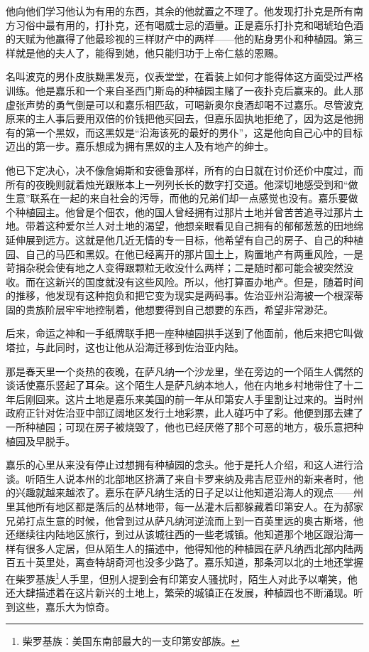 \par 他向他们学习他认为有用的东西，其余的他就置之不理了。他发现打扑克是所有南方习俗中最有用的，打扑克，还有喝威士忌的酒量。正是嘉乐打扑克和喝琥珀色酒的天赋为他赢得了他最珍视的三样财产中的两样——他的贴身男仆和种植园。第三样就是他的夫人了，能得到她，他只能归功于上帝仁慈的恩赐。
\par 名叫波克的男仆皮肤黝黑发亮，仪表堂堂，在着装上如何才能得体这方面受过严格训练。他是嘉乐和一个来自圣西门斯岛的种植园主赌了一夜扑克后赢来的。此人那虚张声势的勇气倒是可以和嘉乐相匹敌，可喝新奥尔良酒却喝不过嘉乐。尽管波克原来的主人事后要用双倍的价钱把他买回去，但嘉乐固执地拒绝了，因为这是他拥有的第一个黑奴，而这黑奴是“沿海该死的最好的男仆”，这是他向自己心中的目标迈出的第一步。嘉乐想成为拥有黑奴的主人及有地产的绅士。
\par 他已下定决心，决不像詹姆斯和安德鲁那样，所有的白日就在讨价还价中度过，而所有的夜晚则就着烛光跟账本上一列列长长的数字打交道。他深切地感受到和“做生意”联系在一起的来自社会的污辱，而他的兄弟们却一点感觉也没有。嘉乐要做个种植园主。他曾是个佃农，他的国人曾经拥有过那片土地并曾苦苦追寻过那片土地。带着这种爱尔兰人对土地的渴望，他想亲眼看见自己拥有的郁郁葱葱的田地绵延伸展到远方。这就是他几近无情的专一目标，他希望有自己的房子、自己的种植园、自己的马匹和黑奴。在他已经离开的那片国土上，购置地产有两重风险，一是苛捐杂税会使有地之人变得跟颗粒无收没什么两样；二是随时都可能会被突然没收。而在这新兴的国度就没有这些风险。所以，他打算置办地产。但是，随着时间的推移，他发现有这种抱负和把它变为现实是两码事。佐治亚州沿海被一个根深蒂固的贵族阶层牢牢地控制着，他想要得到自己想要的东西，希望非常渺茫。
\par 后来，命运之神和一手纸牌联手把一座种植园拱手送到了他面前，他后来把它叫做塔拉，与此同时，这也让他从沿海迁移到佐治亚内陆。
\par 那是春天里一个炎热的夜晚，在萨凡纳一个沙龙里，坐在旁边的一个陌生人偶然的谈话使嘉乐竖起了耳朵。这个陌生人是萨凡纳本地人，他在内地乡村地带住了十二年后刚回来。这片土地是嘉乐来美国的前一年从印第安人手里割让过来的。当时州政府正针对佐治亚中部辽阔地区发行土地彩票，此人碰巧中了彩。他便到那去建了一所种植园；可现在房子被烧毁了，他也已经厌倦了那个可恶的地方，极乐意把种植园及早脱手。
\par 嘉乐的心里从来没有停止过想拥有种植园的念头。他于是托人介绍，和这人进行洽谈。听陌生人说本州的北部地区挤满了来自卡罗来纳及弗吉尼亚州的新来者时，他的兴趣就越来越浓了。嘉乐在萨凡纳生活的日子足以让他知道沿海人的观点——州里其他所有地区都是落后的丛林地带，每一丛灌木后都躲藏着印第安人。在为郝家兄弟打点生意的时候，他曾到过从萨凡纳河逆流而上到一百英里远的奥古斯塔，他还继续往内陆地区旅行，到过从该城往西的一些老城镇。他知道那个地区跟沿海一样有很多人定居，但从陌生人的描述中，他得知他的种植园在萨凡纳西北部内陆两百五十英里处，离查特胡奇河也没多少路了。嘉乐知道，那条河以北的土地还掌握在柴罗基族\footnote{柴罗基族：美国东南部最大的一支印第安部族。}人手里，但别人提到会有印第安人骚扰时，陌生人对此予以嘲笑，他还大肆描述着在这片新兴的土地上，繁荣的城镇正在发展，种植园也不断涌现。听到这些，嘉乐大为惊奇。
